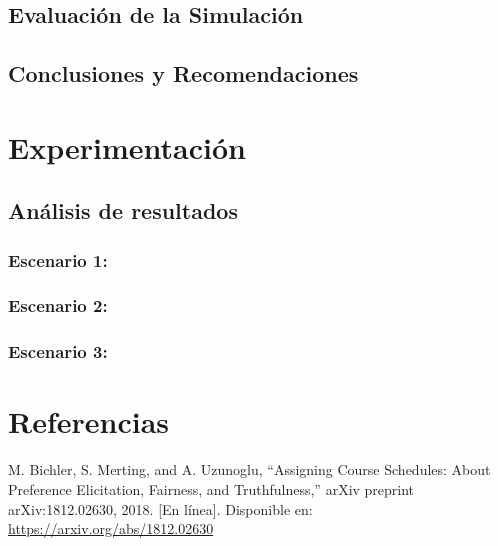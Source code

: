 \documentclass{article}
\begin{document}
\subsection{Evaluación de la Simulación}


\subsection{Conclusiones y Recomendaciones}



\section{Experimentación}\label{sec:exp}

\subsection{Análisis de resultados}

\subsubsection{Escenario 1: }

\subsubsection{Escenario 2: }
 
\subsubsection{Escenario 3: }


\section{Referencias}
\renewcommand{\refname}{}

\begin{thebibliography}{9}

 \label{ref:BPS} M. Bichler, S. Merting, and A. Uzunoglu, 
“Assigning Course Schedules: About Preference Elicitation, Fairness, and Truthfulness,” 
arXiv preprint arXiv:1812.02630, 2018. [En línea]. Disponible en: 
\url{https://arxiv.org/abs/1812.02630}


\end{thebibliography}
\end{document}
